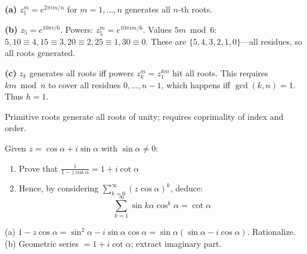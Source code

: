 \begin{solution}
\textbf{(a)} $z_1^m = e^{2\pi im/n}$ for $m=1,\ldots,n$ generates all $n$-th roots.

\textbf{(b)} $z_5 = e^{10\pi i/6}$. Powers: $z_5^m = e^{10\pi im/6}$.
Values $5m \bmod 6$: $5,10\equiv 4, 15\equiv 3, 20\equiv 2, 25\equiv 1, 30\equiv 0$.
These are $\{5,4,3,2,1,0\}$—all residues, so all roots generated.

\textbf{(c)} $z_k$ generates all roots iff powers $z_k^m = z_1^{km}$ hit all roots. This requires $km \bmod n$ to cover all residues $0,\ldots,n-1$, which happens iff $\gcd(k,n)=1$. Thus $h=1$.

\end{solution}

\begin{takeaways}
Primitive roots generate all roots of unity; requires coprimality of index and order.
\end{takeaways}

\vspace{1cm}

\begin{problem}
Given $z = \cos \alpha + i \sin \alpha$ with $\sin \alpha \neq 0$:
\begin{enumerate}
    \item Prove that $\frac{1}{1-z \cos \alpha} = 1 + i \cot \alpha$
    \item Hence, by considering $\sum_{k=0}^{\infty}(z \cos \alpha)^k$, deduce:
    $$ \sum_{k=1}^{\infty} \sin k\alpha \cos^k \alpha = \cot \alpha $$
    
\end{enumerate}
\end{problem}

\vspace{0.5cm}
\begin{hintbox}
(a) $1-z\cos\alpha = \sin^2\alpha - i\sin\alpha\cos\alpha = \sin\alpha(\sin\alpha-i\cos\alpha)$. Rationalize. (b) Geometric series $=1+i\cot\alpha$; extract imaginary part.
\end{hintbox}

